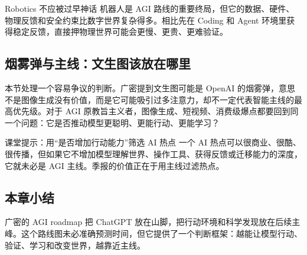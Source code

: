 \begin{warningbox}{Robotics 不应被过早神话}
机器人是 AGI 路线的重要终局，但它的数据、硬件、物理反馈和安全约束比数字世界复杂得多。相比先在 Coding 和 Agent 环境里获得稳定反馈，直接押物理世界可能会更慢、更贵、更难验证。
\end{warningbox}

\subsection{烟雾弹与主线：文生图该放在哪里}

本节处理一个容易争议的判断。广密提到文生图可能是 OpenAI 的烟雾弹，意思不是图像生成没有价值，而是它可能吸引过多注意力，却不一定代表智能主线的最高优先级。对于 AGI 原教旨主义者，图像生成、短视频、消费级爆点都要回到同一个问题：它是否推动模型更聪明、更能行动、更能学习？

\begin{knowledgebox}{课堂提示：用“是否增加行动能力”筛选 AI 热点}
一个 AI 热点可以很商业、很酷、很传播，但如果它不增加模型理解世界、操作工具、获得反馈或迁移能力的深度，它就未必是 AGI 主线。季报的价值正在于用主线过滤热点。
\end{knowledgebox}

\subsection{本章小结}

广密的 AGI roadmap 把 ChatGPT 放在山脚，把行动环境和科学发现放在后续主峰。这个路线图未必准确预测时间，但它提供了一个判断框架：越能让模型行动、验证、学习和改变世界，越靠近主线。

